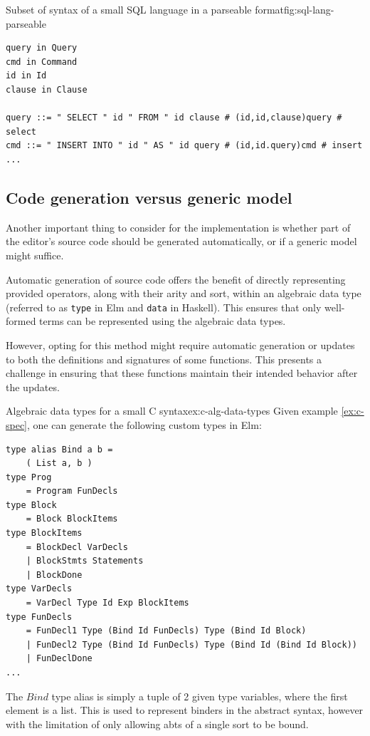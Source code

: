 \begin{example}{Subset of syntax of a small SQL language in a parseable format}{fig:sql-lang-parseable}
  \begin{lstlisting}[style=examplestyle]
query in Query
cmd in Command
id in Id
clause in Clause

query ::= " SELECT " id " FROM " id clause # (id,id,clause)query # select
cmd ::= " INSERT INTO " id " AS " id query # (id,id.query)cmd # insert
...
\end{lstlisting}
\end{example}


\subsection{Code generation versus generic model}

Another important thing to consider for the implementation is whether
part of the editor's source code should be generated automatically,
or if a generic model might suffice.

Automatic generation of source code offers the benefit of directly representing
provided operators, along with their arity and sort, within an algebraic data
type (referred to as \texttt{type} in Elm and \texttt{data} in Haskell).
This ensures that only well-formed terms can be represented using the algebraic
data types.

However, opting for this method might require automatic generation or
updates to both the
definitions and signatures of some functions.
This presents a challenge in ensuring that these functions maintain their intended
behavior after the updates.

\begin{example}{Algebraic data types for a small C syntax}{ex:c-alg-data-types}
  Given example \cref{ex:c-spec}, one can generate the following custom types in Elm:
  \begin{lstlisting}[style=examplestyle]
type alias Bind a b =
    ( List a, b )
type Prog
    = Program FunDecls
type Block
    = Block BlockItems
type BlockItems
    = BlockDecl VarDecls
    | BlockStmts Statements
    | BlockDone
type VarDecls
    = VarDecl Type Id Exp BlockItems
type FunDecls
    = FunDecl1 Type (Bind Id FunDecls) Type (Bind Id Block)
    | FunDecl2 Type (Bind Id FunDecls) Type (Bind Id (Bind Id Block))
    | FunDeclDone
...
\end{lstlisting}

  The $Bind$ type alias is simply a tuple of 2 given type variables,
  where the first element is a list. This is used to represent binders in the
  abstract syntax, however with the limitation of only allowing abts of a single
  sort to be bound.
\end{example}

